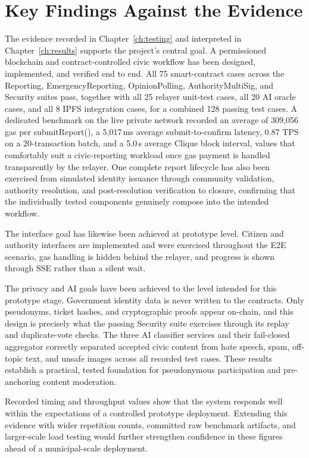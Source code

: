 \section{Key Findings Against the Evidence}
\label{sec:conclusion-findings}

The evidence recorded in Chapter~\ref{ch:testing} and interpreted in Chapter~\ref{ch:results} supports the project's central goal. A permissioned blockchain and contract-controlled civic workflow has been designed, implemented, and verified end to end. All 75 smart-contract cases across the   {Reporting},   {EmergencyReporting},   {OpinionPolling},   {AuthorityMultiSig}, and   {Security} suites pass, together with all 25 relayer unit-test cases, all 20 AI oracle cases, and all 8 IPFS integration cases, for a combined 128 passing test cases. A dedicated benchmark on the live private network recorded an average of 309{,}056 gas per   {submitReport()}, a 5{,}017\,ms average submit-to-confirm latency, 0.87 TPS on a 20-transaction batch, and a 5.0\,s average Clique block interval, values that comfortably suit a civic-reporting workload once gas payment is handled transparently by the relayer. One complete report lifecycle has also been exercised from simulated identity issuance through community validation, authority resolution, and post-resolution verification to closure, confirming that the individually tested components genuinely compose into the intended workflow.

The interface goal has likewise been achieved at prototype level. Citizen and authority interfaces are implemented and were exercised throughout the \ac{E2E} scenario, gas handling is hidden behind the relayer, and progress is shown through SSE rather than a silent wait.

The privacy and AI goals have been achieved to the level intended for this prototype stage. Government identity data is never written to the contracts. Only pseudonyms, ticket hashes, and cryptographic proofs appear on-chain, and this design is precisely what the passing Security suite exercises through its replay and duplicate-vote checks. The three AI classifier services and their fail-closed aggregator correctly separated accepted civic content from hate speech, spam, off-topic text, and unsafe images across all recorded test cases. These results establish a practical, tested foundation for pseudonymous participation and pre-anchoring content moderation. 

Recorded timing and throughput values show that the system responds well within the expectations of a controlled prototype deployment. Extending this evidence with wider repetition counts, committed raw benchmark artifacts, and larger-scale load testing would further strengthen confidence in these figures ahead of a municipal-scale deployment.

